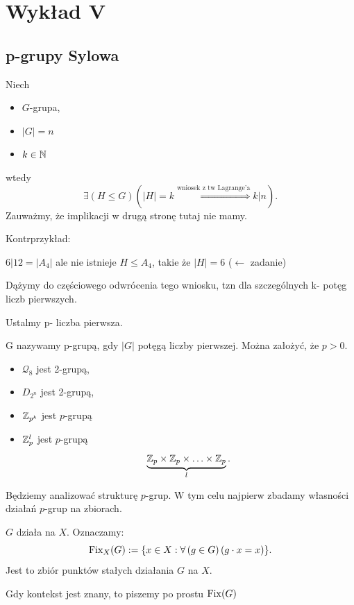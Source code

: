 \chapter{Wykład V}

\section{p-grupy Sylowa}
Niech	
\begin{itemize}
	\item $G$-grupa,
	\item $\left| G \right| = n$
	\item $k\in \mathbb{N}$
\end{itemize}
wtedy \[
\exists\left(H\le G\right)\left( \left| H \right| = k \overset{\text{wniosek z tw Lagrange'a}}{\Longrightarrow} k | n\right)  
.\] 
Zauważmy, że implikacji w drugą stronę tutaj nie mamy.

Kontrprzykład:

$6|12 = \left| A_4 \right| $ ale nie istnieje $H\le A_4$, takie że $\left| H \right| = 6$ ($\leftarrow$ zadanie)

Dążymy do częściowego odwrócenia tego wniosku, tzn dla szczególnych k- potęg liczb pierwszych.

Ustalmy p- liczba pierwsza.

\begin{definition}[p-grupa]
	G nazywamy p-grupą, gdy $\left| G \right| $ potęgą liczby pierwszej. Można założyć, że $p>0$.	
\end{definition} 
\begin{eg}
	\begin{itemize}
		\item $\mathcal{Q}_{8}$ jest 2-grupą, 
		\item $D_{2^{n}}$ jest 2-grupą,
		\item  $\mathbb{Z}_{p^{k}}$ jest $p$-grupą
		\item $\mathbb{Z}_{p}^{l}$ jest $p$-grupą 
			\[
			\underbrace{\mathbb{Z}_{p}\times \mathbb{Z}_{p}\times \ldots\times \mathbb{Z}_{p}}_{l}
			.\] 
	\end{itemize}
\end{eg} 
Będziemy analizować strukturę $p$-grup. W tym celu najpierw zbadamy własności działań $p$-grup na zbiorach.

\begin{definition}
	$G$ działa na $X$. Oznaczamy:
	\[
	\operatorname{Fix}_{X}(G) := \{x\in X: \forall\left(g\in G\right)\left( g\cdot x = x \right)  \} 
	.\] 
	Jest to zbiór punktów stałych działania $G$ na $X$.
\end{definition} 
Gdy kontekst jest znany, to piszemy po prostu $\operatorname{Fix}(G) $

